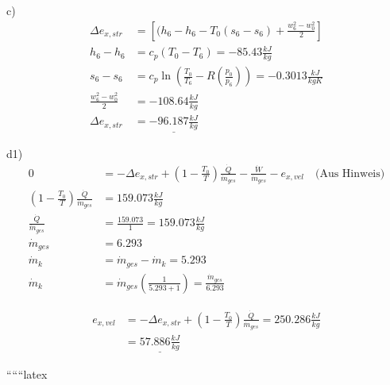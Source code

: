 c) 
\begin{align*}
\Delta e_{x,str} &= \left[ (h_6 - h_6 - T_0 (s_6 - s_6) + \frac{w_6^2 - w_0^2}{2} \right] \\
h_6 - h_6 &= c_p (T_0 - T_6) = -85.43 \frac{kJ}{kg} \\
s_6 - s_6 &= c_p \ln \left( \frac{T_0}{T_6} - R \left( \frac{p_0}{p_6} \right) \right) = -0.3013 \frac{kJ}{kgK} \\
\frac{w_6^2 - w_0^2}{2} &= -108.64 \frac{kJ}{kg} \\
\Delta e_{x,str} &= \underline{-96.187 \frac{kJ}{kg}}
\end{align*}

d1)
\begin{align*}
0 &= -\Delta e_{x,str} + \left( 1 - \frac{T_0}{T} \right) \frac{\dot{Q}}{\dot{m}_{ges}} - \frac{\dot{W}}{\dot{m}_{ges}} - e_{x,vel} \quad \text{(Aus Hinweis)} \\
\left( 1 - \frac{T_0}{T} \right) \frac{\dot{Q}}{\dot{m}_{ges}} &= 159.073 \frac{kJ}{kg} \\
\frac{\dot{Q}}{\dot{m}_{ges}} &= \frac{159.073}{1} = 159.073 \frac{kJ}{kg} \\
\dot{m}_{ges} &= 6.293 \\
\dot{m}_k &= \dot{m}_{ges} - \dot{m}_k = 5.293 \\
\dot{m}_k &= \dot{m}_{ges} \left( \frac{1}{5.293 + 1} \right) = \frac{\dot{m}_{ges}}{6.293}
\end{align*}

\begin{align*}
e_{x,vel} &= -\Delta e_{x,str} + \left( 1 - \frac{T_0}{T} \right) \frac{\dot{Q}}{\dot{m}_{ges}} = 250.286 \frac{kJ}{kg} \\
&= \underline{57.886 \frac{kJ}{kg}}
\end{align*}

``````latex
